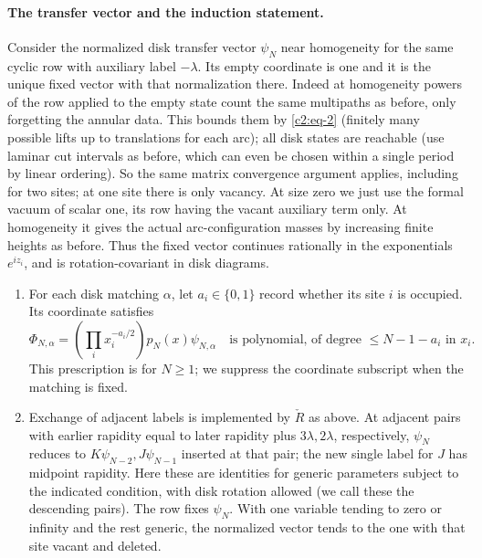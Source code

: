 \paragraph{The transfer vector and the induction statement.}
Consider the normalized disk transfer vector \(\psi_N\) near homogeneity for the same cyclic row with auxiliary label \(-\lambda\). Its empty coordinate is one and it is the unique fixed vector with that normalization there. Indeed at homogeneity powers of the row applied to the empty state count the same multipaths as before, only forgetting the annular data. This bounds them by \eqref{c2:eq-2} (finitely many possible lifts up to translations for each arc); all disk states are reachable (use laminar cut intervals as before, which can even be chosen within a single period by linear ordering). So the same matrix convergence argument applies, including for two sites; at one site there is only vacancy. At size zero we just use the formal vacuum of scalar one, its row having the vacant auxiliary term only. At homogeneity it gives the actual arc-configuration masses by increasing finite heights as before. Thus the fixed vector continues rationally in the exponentials \(e^{iz_i}\), and is rotation-covariant in disk diagrams.

\begin{proposition}
\label{c2:prop-disk-vector}
\begin{enumerate}
\item For each disk matching \(\alpha\), let \(a_i\in\{0,1\}\)
record whether its site \(i\) is occupied. Its coordinate satisfies
\begin{equation}
 \Phi_{N,\alpha}=\left(\prod_i x_i^{-a_i/2}\right)p_N(x)\psi_{N,\alpha}
 \quad\text{is polynomial, of degree }\le N-1-a_i\text{ in }x_i .       \label{c2:eq-23}
\end{equation}
This prescription is for \(N\ge1\); we suppress the coordinate
subscript when the matching is fixed.
\item Exchange of adjacent labels is implemented by \(\check R\) as above. At adjacent pairs with earlier rapidity equal to later rapidity plus \(3\lambda,2\lambda\), respectively, \(\psi_N\) reduces to \(K\psi_{N-2},J\psi_{N-1}\) inserted at that pair; the new single label for \(J\) has midpoint rapidity. Here these are identities for generic parameters subject to the indicated condition, with disk rotation allowed (we call these the descending pairs). The row fixes \(\psi_N\). With one variable tending to zero or infinity and the rest generic, the normalized vector tends to the one with that site vacant and deleted.

\end{enumerate}
\end{proposition}

